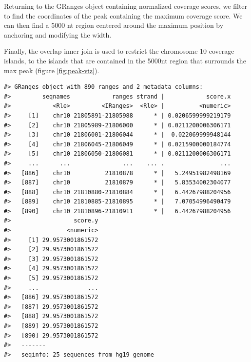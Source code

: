 \documentclass[]{article}
\newenvironment{Shaded}{\begin{snugshade}}{\end{snugshade}}
\newcommand{\DataTypeTok}[1]{\textcolor[rgb]{0.13,0.29,0.53}{#1}}
\newcommand{\DecValTok}[1]{\textcolor[rgb]{0.00,0.00,0.81}{#1}}
\newcommand{\KeywordTok}[1]{\textcolor[rgb]{0.13,0.29,0.53}{\textbf{#1}}}
\newcommand{\NormalTok}[1]{#1}
\newcommand{\OperatorTok}[1]{\textcolor[rgb]{0.81,0.36,0.00}{\textbf{#1}}}
\newcommand{\StringTok}[1]{\textcolor[rgb]{0.31,0.60,0.02}{#1}}
\begin{document}
Returning to the GRanges object containing normalized coverage scores,
we filter to find the coordinates of the peak containing the maximum
coverage score. We can then find a 5000 nt region centered around the
maximum position by anchoring and modifying the width.

\begin{Shaded}
\end{Shaded}

Finally, the overlap inner join is used to restrict the chromosome 10
coverage islands, to the islands that are contained in the 5000nt region
that surrounds the max peak (figure \ref{fig:peak-viz}).

\begin{Shaded}
\end{Shaded}

\begin{verbatim}
#> GRanges object with 890 ranges and 2 metadata columns:
#>         seqnames            ranges strand |            score.x
#>            <Rle>         <IRanges>  <Rle> |          <numeric>
#>     [1]    chr10 21805891-21805988      * | 0.0206599999219179
#>     [2]    chr10 21805989-21806000      * | 0.0211200006306171
#>     [3]    chr10 21806001-21806044      * |  0.022069999948144
#>     [4]    chr10 21806045-21806049      * | 0.0215900000184774
#>     [5]    chr10 21806050-21806081      * | 0.0211200006306171
#>     ...      ...               ...    ... .                ...
#>   [886]    chr10          21810878      * |   5.24951982498169
#>   [887]    chr10          21810879      * |   5.83534002304077
#>   [888]    chr10 21810880-21810884      * |   6.44267988204956
#>   [889]    chr10 21810885-21810895      * |   7.07054996490479
#>   [890]    chr10 21810896-21810911      * |   6.44267988204956
#>                  score.y
#>                <numeric>
#>     [1] 29.9573001861572
#>     [2] 29.9573001861572
#>     [3] 29.9573001861572
#>     [4] 29.9573001861572
#>     [5] 29.9573001861572
#>     ...              ...
#>   [886] 29.9573001861572
#>   [887] 29.9573001861572
#>   [888] 29.9573001861572
#>   [889] 29.9573001861572
#>   [890] 29.9573001861572
#>   -------
#>   seqinfo: 25 sequences from hg19 genome
\end{verbatim}
\end{document}
